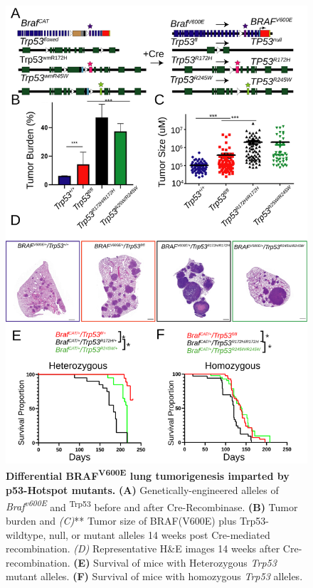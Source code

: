 \begin{figure}
\hypertarget{fig:01}{%
\centering
\includegraphics[width=1\textwidth,height=\textheight]{images/figure1_021022.svg}
\caption{\textbf{Differential BRAF\textsuperscript{V600E} lung tumorigenesis imparted by p53-Hotspot mutants.} \textbf{(A)} Genetically-engineered alleles of \emph{Braf\textsuperscript{v600E}} and \textsuperscript{Trp53} before and after Cre-Recombinase. \textbf{(B)} Tumor burden and \emph{(C)}** Tumor size of BRAF(V600E) plus Trp53-wildtype, null, or mutant alleles 14 weeks post Cre-mediated recombination. \emph{(D)} Representative H\&E images 14 weeks after Cre-recombination. \textbf{(E)} Survival of mice with Heterozygous \emph{Trp53} mutant alleles. \textbf{(F)} Survival of mice with homozygous \emph{Trp53} alleles.}\label{fig:01}
}
\end{figure}

